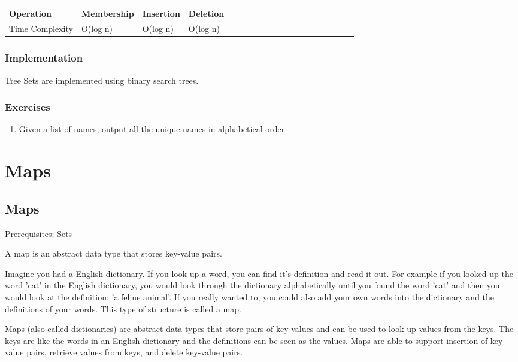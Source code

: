 \documentclass[11pt,oneside]{book}
\begin{document}
\vspace{10px}\begin{tabulary}{0.4\linewidth}{|l|l|l|l|l|l|l|l|l|l|l|l|l|l|l|l|l|l|l}\hline


  Operation &
  Membership &
  Insertion &
  Deletion\\
\hline


  Time Complexity &
  O(log n) &
  O(log n) &
  O(log n)\\

\hline\end{tabulary}

\subsection{Implementation}

Tree Sets are implemented using binary search trees.

\subsection{Exercises}

\begin{enumerate}
\item Given a list of names, output all the unique names in alphabetical order
\end{enumerate}

    \chapter{ Maps }
        \section{ Maps }
        

Prerequisites: Sets

A map is an abstract data type that stores key-value pairs.

Imagine you had a English dictionary. If you look up a word, you can find it's definition and read it out. For example if you looked up the word 'cat' in the English dictionary, you would look through the dictionary alphabetically until you found the word 'cat' and then you would look at the definition: 'a feline animal'. If you really wanted to, you could also add your own words into the dictionary and the definitions of your words. This type of structure is called a map.

Maps (also called dictionaries) are abstract data types that store pairs of key-values and can be used to look up values from the keys. The keys are like the words in an English dictionary and the definitions can be seen as the values. Maps are able to support insertion of key-value pairs, retrieve values from keys, and delete key-value pairs.
\end{document}
